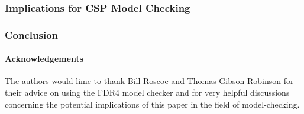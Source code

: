 \subsubsection*{Implications for CSP Model Checking}

\subsubsection*{Conclusion}


\paragraph{Acknowledgements}
The authors would lime to thank Bill Roscoe and Thomas Gibson-Robinson for their advice on using the FDR4 model checker and for very helpful discussions concerning the potential implications of this paper in the field of model-checking.

